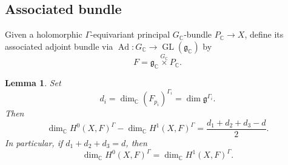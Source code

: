 \documentclass[11pt,a4paper,reqno]{amsart}
\theoremstyle{plain}
\newtheorem{lemma}[theorem]{Lemma}
\theoremstyle{definition}
\theoremstyle{remark}
\numberwithin{equation}{section}
\DeclareMathOperator{\Ad}{Ad}
\newcommand{\CC}{\mathbb C}
\newcommand{\fg}{\mathfrak g}
\begin{document}
\subsection{Associated bundle}

Given a holomorphic $\Gamma$-equivariant principal $G_{\CC}$-bundle $P_{\CC}\to X$, define its associated adjoint bundle via $\Ad\colon G_{\CC}\to\operatorname{GL}(\fg_{\CC})$ by
\[
F=\fg_{\CC}\overset{G_{\CC}}{\times} P_{\CC}.
\]

\begin{lemma}
\label{lem:invariant-riemann-roch}
Set
\[
d_i=\dim_{\CC}(F_{p_i})^{\Gamma_i}=\dim \fg^{\Gamma_i}.
\]
Then
\[
\dim_{\CC}H^0(X,F)^\Gamma-\dim_{\CC}H^1(X,F)^\Gamma=\frac{d_1+d_2+d_3-d}{2}.
\]
In particular, if $d_1+d_2+d_3=d$, then
\[
\dim_{\CC}H^0(X,F)^\Gamma=\dim_{\CC}H^1(X,F)^\Gamma.
\]
\end{lemma}
\end{document}
